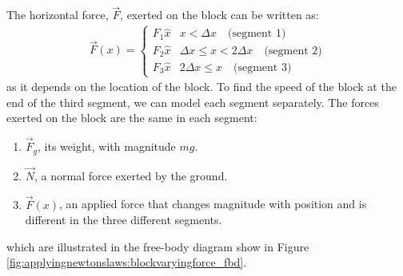 The horizontal force, $\vec F$, exerted on the block can be written as:
\begin{align*}
  \vec F (x)=
  \begin{cases}
    F_1\hat x & x<\Delta x \quad \text{(segment 1)}\\
    F_2\hat x & \Delta x \leq x< 2\Delta x \quad \text{(segment 2)}\\
    F_3\hat x & 2\Delta x \leq x\quad \text{(segment 3)}
  \end{cases}
\end{align*}
as it depends on the location of the block. To find the speed of the block at the end of the third segment, we can model each segment separately. The forces exerted on the block are the same in each segment:
\begin{enumerate}
\item $\vec F_g$, its weight, with magnitude $mg$.
\item $\vec N$, a normal force exerted by the ground.
\item $\vec F(x)$, an applied force that changes magnitude with position and is different in the three different segments.
\end{enumerate}
which are illustrated in the free-body diagram show in Figure \ref{fig:applyingnewtonslaws:blockvaryingforce_fbd}.


